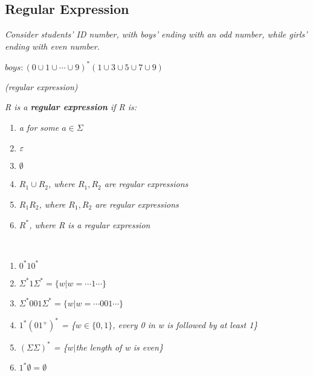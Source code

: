 \documentclass{article}
\begin{document}
\subsection{Regular Expression}

\begin{example}
    \textit{Consider students' ID number, with boys' ending with an odd number, while girls' ending with even number.}

    $boys:(0\cup1\cup\cdots\cup9)^*(1\cup3\cup5\cup7\cup9)$

\end{example}

\begin{defn}
    \textit{(regular expression)}

    \textit{R is a \textbf{regular expression} if R is: }

    \begin{enumerate}
        \item \textit{a for some $a\in \Sigma$}
        \item $\varepsilon$
        \item $\emptyset$
        \item \textit{$R_1\cup R_2$, where $R_1,R_2$ are regular expressions}
        \item \textit{$R_1R_2$, where $R_1,R_2$ are regular expressions}
        \item \textit{$R^*$, where R is a regular expression}
    \end{enumerate}
\end{defn}

\begin{example}
    \

    \begin{enumerate}
        \item $0^*10^*$  
        \item $\Sigma^*1\Sigma^* = \{w|w = \cdots1\cdots\}$
        \item $\Sigma^*001\Sigma^* = \{w|w = \cdots001\cdots\}$
        \item \textit{$1^*(01^+)^*$ = \{$w\in \{0,1\}$, every 0 in w is followed by at least 1\}}
        \item \textit{$(\Sigma\Sigma)^*$ = \{$w|$the length of w is even\}}
        \item $1^*\emptyset = \emptyset$
    \end{enumerate}
\end{example}
\end{document}

